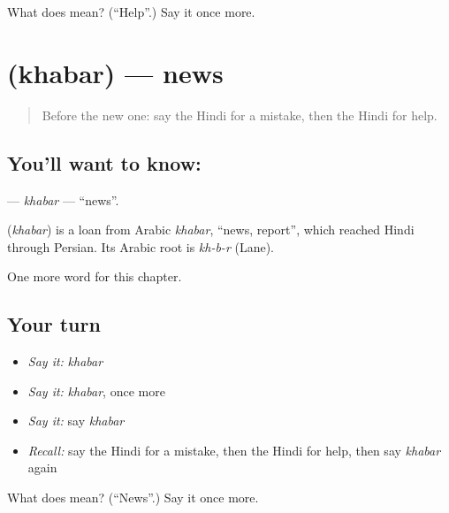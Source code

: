 \begin{tcolorbox}[breakable,colback=teal!4,colframe=teal!35!black,title={Before you move on}]
What does  mean? (\textquotedblleft{}Help\textquotedblright{}.) Say it once more.
\end{tcolorbox}
\section[\texorpdfstring{\hi{ख़बर} (khabar)}{ख़बर (khabar)}]{ (khabar) — news}

\label{lesson:HI-C190-khabar}



\begin{quote}
Before the new one: say the Hindi for a mistake, then the Hindi for help.
\end{quote}

\subsection*{You'll want to know: }
\textbf{} — \emph{khabar} — \textquotedblleft{}news\textquotedblright{}.

\begin{cousinweb}
\textbf{} (\emph{khabar}) is a loan from Arabic \emph{khabar}, \textquotedblleft{}news, report\textquotedblright{}, which reached Hindi through Persian. Its Arabic root is \emph{kh-b-r} (Lane).
\end{cousinweb}

\begin{grammarlens}[title={What you've built}]
One more word for this chapter.
\end{grammarlens}

\subsection*{Your turn}
\begin{itemize}
\raggedright
  \item \emph{Say it:} \emph{khabar}
  \item \emph{Say it:} \emph{khabar}, once more
  \item \emph{Say it:} say \emph{khabar}
  \item \emph{Recall:} say the Hindi for a mistake, then the Hindi for help, then say \emph{khabar} again
\end{itemize}

\begin{tcolorbox}[breakable,colback=teal!4,colframe=teal!35!black,title={Before you move on}]
What does  mean? (\textquotedblleft{}News\textquotedblright{}.) Say it once more.
\end{tcolorbox}
